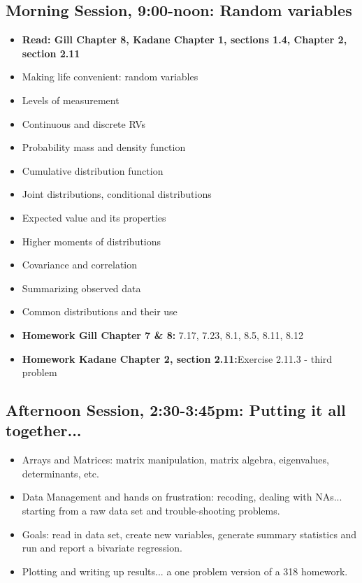 \documentclass[12pt,a4paper]{article}
\begin{document}
\subsection*{Morning Session, 9:00-noon: Random variables}
\begin{itemize}
\setlength{\itemsep}{0pt}
\footnotesize
\item \textbf{Read: Gill Chapter 8, Kadane Chapter 1, sections 1.4, Chapter 2, section 2.11}
\item Making life convenient: random variables
\item Levels of measurement
\item Continuous and discrete RVs
\item Probability mass and density function
\item Cumulative distribution function
\item Joint distributions, conditional distributions
\item Expected value and its properties
\item Higher moments of distributions
\item Covariance and correlation
\item Summarizing observed data
\item Common distributions and their use
\item \textbf{Homework Gill Chapter 7 \& 8:} 7.17, 7.23, 8.1, 8.5, 8.11, 8.12
\item \textbf{Homework Kadane Chapter 2, section 2.11:}Exercise 2.11.3 - third problem
\end{itemize}



\subsection*{Afternoon Session, 2:30-3:45pm: Putting it all together...}
\begin{itemize}
\setlength{\itemsep}{0pt}
\footnotesize
\item Arrays and Matrices: matrix manipulation, matrix algebra, eigenvalues, determinants, etc.
\item Data Management and hands on frustration: recoding, dealing with NAs... starting from a raw data set and trouble-shooting problems.
\item Goals: read in data set, create new variables, generate summary statistics and run and report a bivariate regression.
\item Plotting and writing up results... a one problem version of a 318 homework.
\end{itemize}


 
\end{document}
